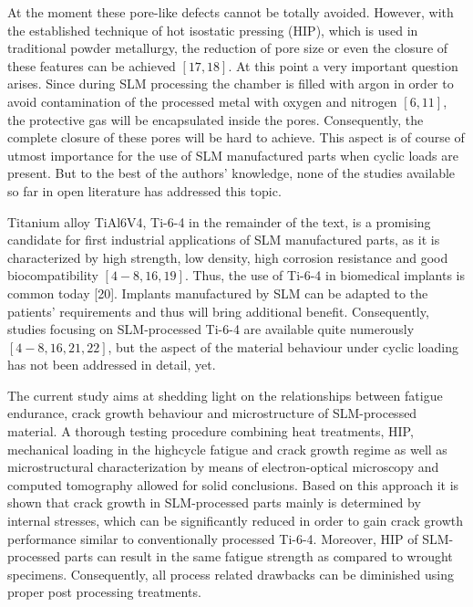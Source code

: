 \documentclass[10pt]{article}
\begin{document}
At the moment these pore-like defects cannot be totally avoided. However, with the established technique of hot isostatic pressing (HIP), which is used in traditional powder metallurgy, the reduction of pore size or even the closure of these features can be achieved $[17,18]$. At this point a very important question arises. Since during SLM processing the chamber is filled with argon in order to avoid contamination of the processed metal with oxygen and nitrogen $[6,11]$, the protective gas will be encapsulated inside the pores. Consequently, the complete closure of these pores will be hard to achieve. This aspect is of course of utmost importance for the use of SLM manufactured parts when cyclic loads are present. But to the best of the authors' knowledge, none of the studies available so far in open literature has addressed this topic.

Titanium alloy TiAl6V4, Ti-6-4 in the remainder of the text, is a promising candidate for first industrial applications of SLM manufactured parts, as it is characterized by high strength, low density, high corrosion resistance and good biocompatibility $[4-8,16,19]$. Thus, the use of Ti-6-4 in biomedical implants is common today [20]. Implants manufactured by SLM can be adapted to the patients' requirements and thus will bring additional benefit. Consequently, studies focusing on SLM-processed Ti-6-4 are available quite numerously $[4-8,16,21,22]$, but the aspect of the material behaviour under cyclic loading has not been addressed in detail, yet.

The current study aims at shedding light on the relationships between fatigue endurance, crack growth behaviour and microstructure of SLM-processed material. A thorough testing procedure combining heat treatments, HIP, mechanical loading in the highcycle fatigue and crack growth regime as well as microstructural characterization by means of electron-optical microscopy and computed tomography allowed for solid conclusions. Based on this approach it is shown that crack growth in SLM-processed parts mainly is determined by internal stresses, which can be significantly reduced in order to gain crack growth performance similar to conventionally processed Ti-6-4. Moreover, HIP of SLM-processed parts can result in the same fatigue strength as compared to wrought specimens. Consequently, all process related drawbacks can be diminished using proper post processing treatments.
\end{document}
